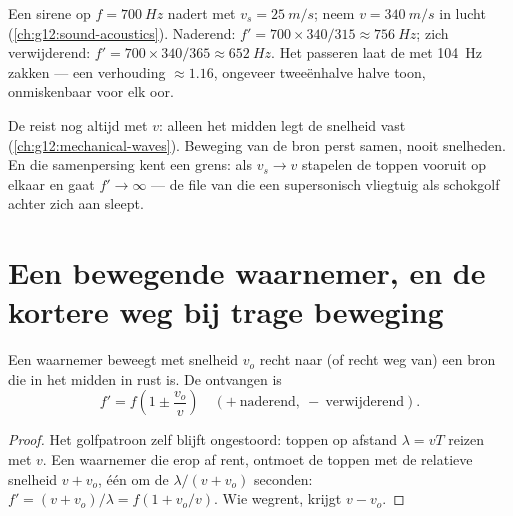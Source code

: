 \begin{example}\label{ex:g12:doppler-effect:siren}
Een sirene op $f = \qty{700}{Hz}$ nadert met $v_s = \qty{25}{m/s}$; neem
$v = \qty{340}{m/s}$ in lucht (\cref{ch:g12:sound-acoustics}). Naderend:
$f' = 700 \times 340/315 \approx \qty{756}{Hz}$; zich verwijderend:
$f' = 700 \times 340/365 \approx \qty{652}{Hz}$. Het passeren laat de
 met \qty{104}{Hz} zakken --- een verhouding
$\approx 1.16$, ongeveer tweeënhalve halve toon, onmiskenbaar voor elk
oor.
\end{example}

\begin{remark}\label{rem:g12:doppler-effect:speed-unchanged}
De  reist nog altijd met $v$: alleen het midden legt de snelheid vast
(\cref{ch:g12:mechanical-waves}). Beweging van de bron perst
\emph{} samen, nooit snelheden. En die samenpersing kent een
grens: als $v_s \to v$ stapelen de toppen vooruit op elkaar en gaat
$f' \to \infty$ --- de file van  die een supersonisch vliegtuig
als schokgolf achter zich aan sleept.
\end{remark}

\section{Een bewegende waarnemer, en de kortere weg bij trage beweging}

\begin{proposition}\label{prop:g12:doppler-effect:moving-observer}
Een waarnemer beweegt met snelheid $v_o$ recht naar (of recht weg van) een
bron die in het midden in rust is. De ontvangen  is
\[ f' = f\left(1 \pm \frac{v_o}{v}\right) \quad (+\ \text{naderend},\ -\ \text{verwijderend}). \]
\end{proposition}

\begin{proof}
Het golfpatroon zelf blijft ongestoord: toppen op afstand $\lambda = vT$
reizen met $v$. Een waarnemer die erop af rent, ontmoet de toppen met de
relatieve snelheid $v + v_o$, één om de $\lambda/(v + v_o)$ seconden:
$f' = (v + v_o)/\lambda = f(1 + v_o/v)$. Wie wegrent, krijgt $v - v_o$.
\end{proof}

